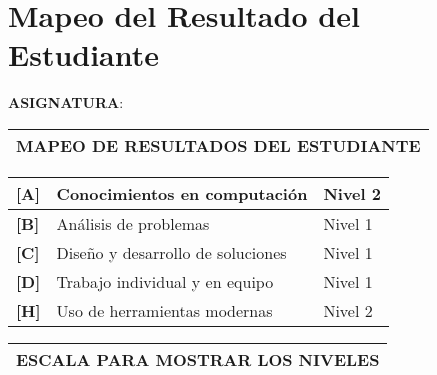 \chapter{Mapeo del Resultado del Estudiante}
\newpage

\pagestyle{fancy} 

%


\clearpage


\vspace{1cm}
{\centering 
	\MakeUppercase{\textbf{Asignatura}}: \MakeUppercase{\cscourse}} \\
\vspace{0.5cm}

\begin{table}[H]
	\centering
	\begin{tabular}{|x{\textwidth}|}
		\hline 
		 \textbf{MAPEO DE RESULTADOS DEL ESTUDIANTE} \\ \hline
	\end{tabular}
\end{table}

\begin{table}[H]
	\centering
	\begin{tabular}{|x{2cm}|p{10cm}|x{2.1cm}|}
		\hline 
		\textbf{[A]} & Conocimientos en computación & Nivel 2 \\ \hline
		\textbf{[B]} & Análisis de problemas & Nivel 1\\ \hline
		\textbf{[C]} & Diseño y desarrollo de soluciones & Nivel 1\\ \hline
		\textbf{[D]} & Trabajo individual y en equipo & Nivel 1\\ \hline
		\textbf{[H]} & Uso de herramientas modernas & Nivel 2\\ \hline
	\end{tabular}
\end{table}

\begin{table}[H]
	\centering
	\begin{tabular}{|x{\textwidth}|}
		\hline 
		 \textbf{ESCALA PARA MOSTRAR LOS NIVELES} \\ \hline
	\end{tabular}
\end{table}

